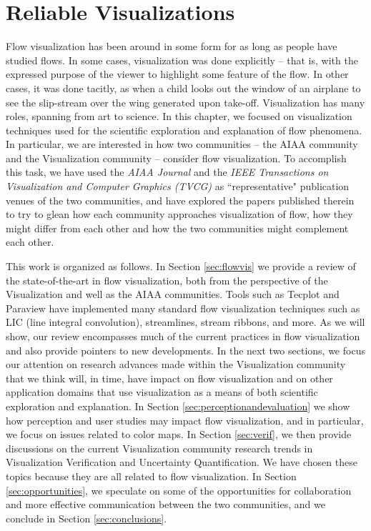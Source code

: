 \chapter{Reliable Visualizations}
\label{chap:aiaa}

Flow visualization has been around in some form for as long as people have studied flows.  In some
cases, visualization was done explicitly -- that is, with the expressed purpose of the viewer to highlight
some feature of the flow.  In other cases, it was done tacitly, as when a child looks out the window
of an airplane to see the slip-stream over the wing generated upon take-off.  Visualization has
many roles, spanning from art to science.  In this chapter, we focused on visualization techniques
used for the scientific exploration and explanation of flow phenomena.  In particular, we are interested
in how two communities -- the AIAA community and the Visualization community -- consider
flow visualization.  To accomplish this task, we have used the {\em AIAA Journal} and the
{\em IEEE Transactions on Visualization and Computer Graphics (TVCG)} as ``representative" publication
venues of the two communities, and have explored the papers published therein to try to 
glean how each community approaches visualization of flow, how they might differ from each other 
and how the two communities might complement each other. 

This work is organized as follows.  In Section \ref{sec:flowvis} we provide a review of the state-of-the-art
in flow visualization, both from the perspective of the Visualization and well as the AIAA communities. 
%
Tools such as Tecplot\cite{amtec1996tecplot} and Paraview\cite{squillacote2007paraview} have implemented many 
standard flow visualization techniques such as LIC (line integral convolution), streamlines, stream ribbons, and more. 
As we will show, our review encompasses much of the current practices in 
flow visualization and also provide pointers to new developments. 
%
In the next two sections, we focus our attention on research advances made within the Visualization 
community that we think will, in time, have impact on flow visualization and on other application domains
that use visualization as a means of both scientific exploration and explanation.  
In Section \ref{sec:perceptionandevaluation} we show how perception and user studies may impact flow visualization, and
in particular, we focus on
issues related to color maps.  In Section \ref{sec:verif}, we then provide
discussions on the current Visualization community research trends in Visualization Verification 
and Uncertainty Quantification.  We have chosen these topics because they are all related to flow visualization.
In Section \ref{sec:opportunities}, we speculate on some of the opportunities for collaboration and
more effective communication between the two communities, and we conclude in Section
\ref{sec:conclusions}.

